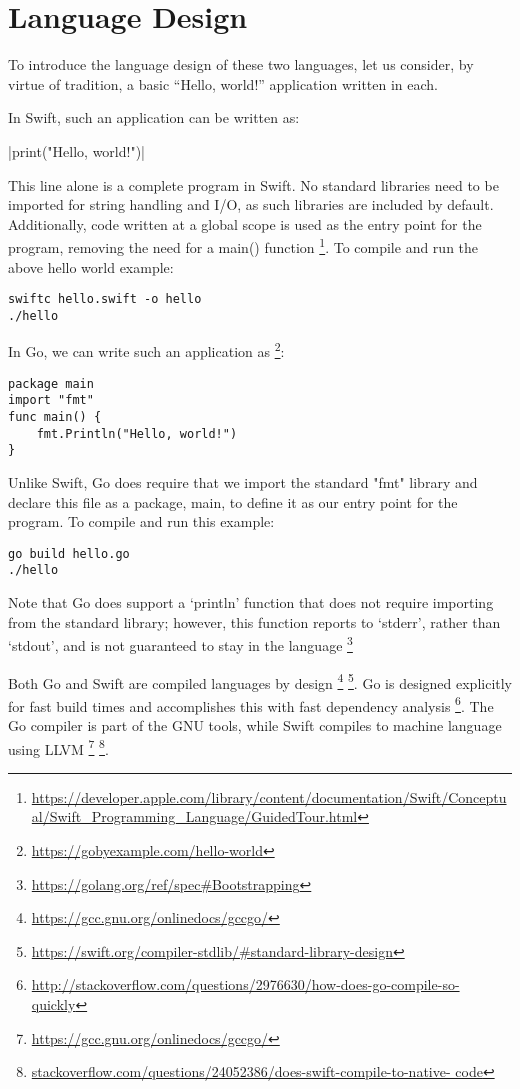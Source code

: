\documentclass[letterpaper]{article}
\begin{document}
\section{Language Design}

To introduce the language design of these two languages, let us consider, by virtue of tradition, a basic “Hello, world!” application written in each.

In Swift, such an application can be written as:

|print("Hello, world!")|

This line alone is a complete program in Swift. No standard libraries need to be imported for string handling and I/O, as such libraries are included by default. Additionally, code written at a global scope is used as the entry point for the program, removing the need for a main() function \footnote{\url{https://developer.apple.com/library/content/documentation/Swift/Conceptual/Swift_Programming_Language/GuidedTour.html}}. To compile and run the above hello world example:

\begin{verbatim}
swiftc hello.swift -o hello
./hello
\end{verbatim}

In Go, we can write such an application as \footnote{\url{https://gobyexample.com/hello-world}}:

\begin{verbatim}
package main
import "fmt"
func main() {
    fmt.Println("Hello, world!")
}
\end{verbatim}

Unlike Swift, Go does require that we import the standard "fmt" library and declare this file as a package, main, to define it as our entry point for the program. To compile and run this example:

\begin{verbatim}
go build hello.go
./hello
\end{verbatim}

Note that Go does support a `println' function that does not require importing from the standard library; however, this function reports to `stderr', rather than `stdout', and is not guaranteed to stay in the language \footnote{\url{https://golang.org/ref/spec#Bootstrapping}}

Both Go and Swift are compiled languages by design \footnote{\url{https://gcc.gnu.org/onlinedocs/gccgo/}} \footnote{\url{https://swift.org/compiler-stdlib/#standard-library-design}}. Go is designed explicitly for fast build times and accomplishes this with fast dependency analysis \footnote{\url{http://stackoverflow.com/questions/2976630/how-does-go-compile-so-quickly}}. The Go compiler is part of the GNU tools, while Swift compiles to machine language using LLVM \footnote{\url{https://gcc.gnu.org/onlinedocs/gccgo/}} \footnote{\url{stackoverflow.com/questions/24052386/does-swift-compile-to-native-
code}}.
\end{document}

